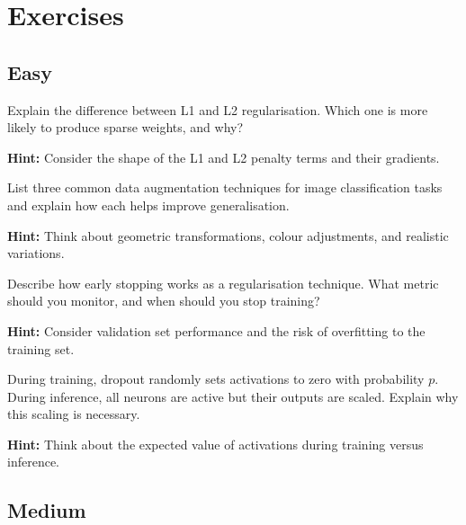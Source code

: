 
\section*{Exercises}

\subsection*{Easy}

\begin{problem}[L1 vs L2 Regularisation]
Explain the difference between L1 and L2 regularisation. Which one is more likely to produce sparse weights, and why?

\textbf{Hint:} Consider the shape of the L1 and L2 penalty terms and their gradients.
\end{problem}

\begin{problem}
List three common data augmentation techniques for image classification tasks and explain how each helps improve generalisation.

\textbf{Hint:} Think about geometric transformations, colour adjustments, and realistic variations.
\end{problem}

\begin{problem}
Describe how early stopping works as a regularisation technique. What metric should you monitor, and when should you stop training?

\textbf{Hint:} Consider validation set performance and the risk of overfitting to the training set.
\end{problem}

\begin{problem}
During training, dropout randomly sets activations to zero with probability $p$. During inference, all neurons are active but their outputs are scaled. Explain why this scaling is necessary.

\textbf{Hint:} Think about the expected value of activations during training versus inference.
\end{problem}

\subsection*{Medium}

